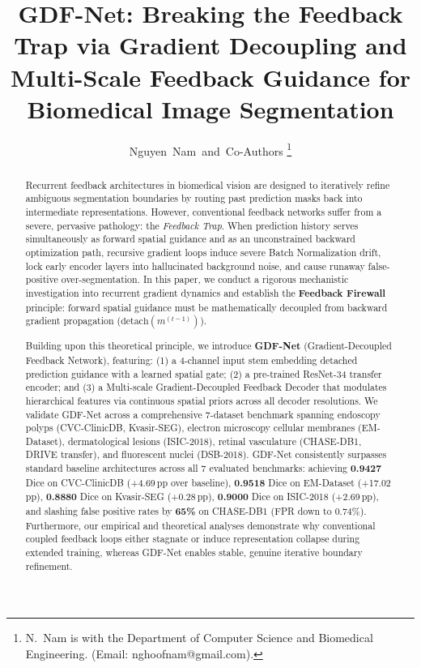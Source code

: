 \documentclass[journal, 10pt]{IEEEtran}
\begin{document}
\title{GDF-Net: Breaking the Feedback Trap via Gradient Decoupling and Multi-Scale Feedback Guidance for Biomedical Image Segmentation}

\author{%
  Nguyen~Nam~and~Co-Authors%
  \thanks{N.~Nam is with the Department of Computer Science and Biomedical Engineering. (Email: nghoofnam@gmail.com).}%
}

\maketitle

\begin{abstract}
Recurrent feedback architectures in biomedical vision are designed to iteratively refine ambiguous segmentation boundaries by routing past prediction masks back into intermediate representations. However, conventional feedback networks suffer from a severe, pervasive pathology: the \textit{Feedback Trap}. When prediction history serves simultaneously as forward spatial guidance and as an unconstrained backward optimization path, recursive gradient loops induce severe Batch Normalization drift, lock early encoder layers into hallucinated background noise, and cause runaway false-positive over-segmentation. In this paper, we conduct a rigorous mechanistic investigation into recurrent gradient dynamics and establish the \textbf{Feedback Firewall} principle: forward spatial guidance must be mathematically decoupled from backward gradient propagation ($\text{detach}(m^{(t-1)})$).

Building upon this theoretical principle, we introduce \textbf{GDF-Net} (Gradient-Decoupled Feedback Network), featuring: (1) a 4-channel input stem embedding detached prediction guidance with a learned spatial gate; (2) a pre-trained ResNet-34 transfer encoder; and (3) a Multi-scale Gradient-Decoupled Feedback Decoder that modulates hierarchical features via continuous spatial priors across all decoder resolutions. We validate GDF-Net across a comprehensive 7-dataset benchmark spanning endoscopy polyps (CVC-ClinicDB, Kvasir-SEG), electron microscopy cellular membranes (EM-Dataset), dermatological lesions (ISIC-2018), retinal vasculature (CHASE-DB1, DRIVE transfer), and fluorescent nuclei (DSB-2018). GDF-Net consistently surpasses standard baseline architectures across all 7 evaluated benchmarks: achieving \textbf{0.9427} Dice on CVC-ClinicDB (+4.69\,pp over baseline), \textbf{0.9518} Dice on EM-Dataset (+17.02\,pp), \textbf{0.8880} Dice on Kvasir-SEG (+0.28\,pp), \textbf{0.9000} Dice on ISIC-2018 (+2.69\,pp), and slashing false positive rates by \textbf{65\%} on CHASE-DB1 (FPR down to 0.74\%). Furthermore, our empirical and theoretical analyses demonstrate why conventional coupled feedback loops either stagnate or induce representation collapse during extended training, whereas GDF-Net enables stable, genuine iterative boundary refinement.
\end{abstract}
\end{document}
